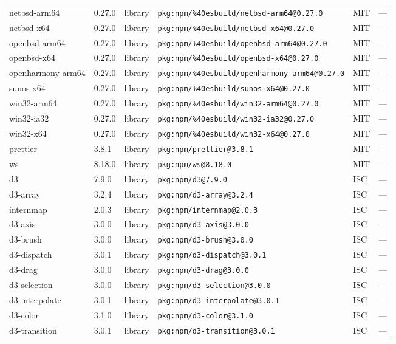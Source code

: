 \documentclass[11pt]{article}
\begin{document}
\begin{longtable}{|l|l|l|p{2.2cm}|l|p{4cm}|}
netbsd-arm64 & 0.27.0 & library & \texttt{pkg:npm/\%40esbuild/netbsd-arm64@0.27.0} & MIT & — \\
netbsd-x64 & 0.27.0 & library & \texttt{pkg:npm/\%40esbuild/netbsd-x64@0.27.0} & MIT & — \\
openbsd-arm64 & 0.27.0 & library & \texttt{pkg:npm/\%40esbuild/openbsd-arm64@0.27.0} & MIT & — \\
openbsd-x64 & 0.27.0 & library & \texttt{pkg:npm/\%40esbuild/openbsd-x64@0.27.0} & MIT & — \\
openharmony-arm64 & 0.27.0 & library & \texttt{pkg:npm/\%40esbuild/openharmony-arm64@0.27.0} & MIT & — \\
sunos-x64 & 0.27.0 & library & \texttt{pkg:npm/\%40esbuild/sunos-x64@0.27.0} & MIT & — \\
win32-arm64 & 0.27.0 & library & \texttt{pkg:npm/\%40esbuild/win32-arm64@0.27.0} & MIT & — \\
win32-ia32 & 0.27.0 & library & \texttt{pkg:npm/\%40esbuild/win32-ia32@0.27.0} & MIT & — \\
win32-x64 & 0.27.0 & library & \texttt{pkg:npm/\%40esbuild/win32-x64@0.27.0} & MIT & — \\
prettier & 3.8.1 & library & \texttt{pkg:npm/prettier@3.8.1} & MIT & — \\
ws & 8.18.0 & library & \texttt{pkg:npm/ws@8.18.0} & MIT & — \\
d3 & 7.9.0 & library & \texttt{pkg:npm/d3@7.9.0} & ISC & — \\
d3-array & 3.2.4 & library & \texttt{pkg:npm/d3-array@3.2.4} & ISC & — \\
internmap & 2.0.3 & library & \texttt{pkg:npm/internmap@2.0.3} & ISC & — \\
d3-axis & 3.0.0 & library & \texttt{pkg:npm/d3-axis@3.0.0} & ISC & — \\
d3-brush & 3.0.0 & library & \texttt{pkg:npm/d3-brush@3.0.0} & ISC & — \\
d3-dispatch & 3.0.1 & library & \texttt{pkg:npm/d3-dispatch@3.0.1} & ISC & — \\
d3-drag & 3.0.0 & library & \texttt{pkg:npm/d3-drag@3.0.0} & ISC & — \\
d3-selection & 3.0.0 & library & \texttt{pkg:npm/d3-selection@3.0.0} & ISC & — \\
d3-interpolate & 3.0.1 & library & \texttt{pkg:npm/d3-interpolate@3.0.1} & ISC & — \\
d3-color & 3.1.0 & library & \texttt{pkg:npm/d3-color@3.1.0} & ISC & — \\
d3-transition & 3.0.1 & library & \texttt{pkg:npm/d3-transition@3.0.1} & ISC & — \\

\end{longtable}
\end{document}
